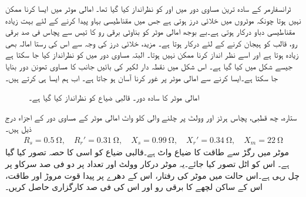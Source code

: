 ٹرانسفارمر کے سادہ ترین مساوی دور میں  اور  کو نظرانداز کیا گیا تھا۔ امالی موٹر میں ایسا کرنا ممکن نہیں ہوتا چونکہ موٹروں میں خلائی درز ہوتی ہے جس میں مقناطیسی بہاو پیدا کرنے کے لئے بہت زیادہ مقناطیسی دباو درکار ہوتی ہے۔بے بوجھ امالی موٹر کو بناوٹی برقی رو کا تیس سے پچاس فی صد برقی رو، قالب کو ہیجان کرنے کے لئے درکار ہوتا ہے۔ مزید، خلائی درز کی وجہ سے اس کی رستا امالہ بھی زیادہ ہوتا ہے اور اسے نظر انداز کرنا ممکن نہیں ہوتا۔ البتہ مساوی دور میں  کو نظرانداز کیا جا سکتا ہے جیسے شکل  میں کیا گیا ہے۔ اس شکل میں نقطہ دار لکیر کی بائیں جانب کا مساوی تھونن دور بنایا جا سکتا ہے۔ایسا کرنے سے امالی موٹر پر غور کرنا  آسان ہو جاتا ہے۔ اب ہم ایسا ہی کرتے ہیں۔
\begin{figure}
\centering
\caption{امالی موٹر کا سادہ دور۔ قالبی ضیاع کو نظرانداز کیا گیا ہے۔}
\label{شکل_امالی_ساکن_حصے_کا_تھونن_دور}
\end{figure}
%
ستارہ، چھ قطبی، پچاس ہرٹز اور   وولٹ پر چلنے والی   کلو واٹ امالی موٹر کے مساوی دور کے اجزاء درج ذیل ہیں۔
\begin{align*}
R_s= \SI{0.5}{\ohm}, \quad R_r'=\SI{0.31}{\ohm}, \quad X_s=\SI{0.99}{\ohm}, \quad X_r'=\SI{0.34}{\ohm}, \quad X_m=\SI{22}{\ohm} 
\end{align*}
موٹر میں رگڑ سے طاقت کا ضیاع   واٹ ہے۔قالبی ضیاع کو اسی کا حصہ تصور کیا گیا ہے۔ اس کو اٹل تصور کیا جائے۔یہ موٹر درکار وولٹ اور تعداد  پر دو فی صد سرکاو پر چل رہی ہے۔اس حالت میں موٹر کی رفتار، اس کے دھرے پر پیدا قوت مروڑ اور طاقت، اس کے ساکن لچھے کا برقی رو اور اس کی فی صد کارگزاری حاصل کریں۔


